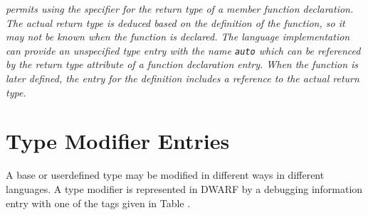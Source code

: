 {\textit{ permits using the 
\autoreturntype{} specifier for the return type of a member function declaration. 
The actual return type is deduced based on the definition of the 
function, so it may not be known when the function is declared.  The language 
implementation can provide an unspecified type entry with the name \texttt{auto} which 
can be referenced by the return type attribute of a function declaration entry.  
When the function is later defined, the \DWTAGsubprogram{} entry for the definition
includes a reference to the actual return type.}


\section{Type Modifier Entries}
\label{chap:typemodifierentries}
A base or user\dash defined type may be modified in different ways
in different languages. A type modifier is represented in
DWARF by a debugging information entry with one of the tags
given in Table .

}
